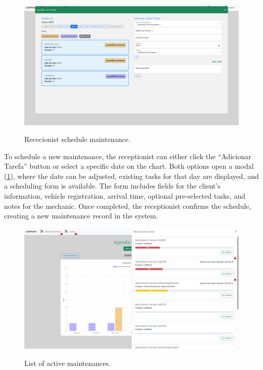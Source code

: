 

\begin{figure}[h]
  \caption{Rececionist schedule maintenance.}
  \centering
  \includegraphics[width=\textwidth]{figs/Implementation/rececionist/addTask}
  \label{fig:impReceAddTask}
\end{figure}

To schedule a new maintenance, the receptionist can either click the “Adicionar Tarefa” button or select a specific date on the chart. Both options open a modal (\ref{fig:impReceAddTask}), where the date can be adjusted, existing tasks for that day are displayed, and a scheduling form is available. The form includes fields for the client's information, vehicle registration, arrival time, optional pre-selected tasks, and notes for the mechanic. Once completed, the receptionist confirms the schedule, creating a new maintenance record in the system.

\begin{figure}[h]
  \caption{List of active maintenances.}
  \centering
  \includegraphics[width=\textwidth]{figs/Implementation/rececionist/activeMaintenances}
  \label{fig:impReceListMaint}
\end{figure}

